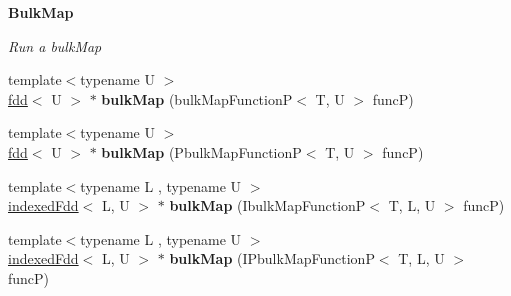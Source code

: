 \begin{Indent}{\bf Bulk\+Map}\par
{\em Run a bulk\+Map }\begin{DoxyCompactItemize}
\item 
\hypertarget{classfaster_1_1fdd_a0b4b82535fe1d2746973ce4e203d619f}{}\label{classfaster_1_1fdd_a0b4b82535fe1d2746973ce4e203d619f} 
{\footnotesize template$<$typename U $>$ }\\\hyperlink{classfaster_1_1fdd}{fdd}$<$ U $>$ $\ast$ {\bfseries bulk\+Map} (bulk\+Map\+FunctionP$<$ T, U $>$ funcP)
\item 
\hypertarget{classfaster_1_1fdd_a72e07b032ee97aeed0261a20769720a7}{}\label{classfaster_1_1fdd_a72e07b032ee97aeed0261a20769720a7} 
{\footnotesize template$<$typename U $>$ }\\\hyperlink{classfaster_1_1fdd}{fdd}$<$ U $>$ $\ast$ {\bfseries bulk\+Map} (Pbulk\+Map\+FunctionP$<$ T, U $>$ funcP)
\item 
\hypertarget{classfaster_1_1fdd_a97ad1e63823abe30de230da1456481d4}{}\label{classfaster_1_1fdd_a97ad1e63823abe30de230da1456481d4} 
{\footnotesize template$<$typename L , typename U $>$ }\\\hyperlink{classfaster_1_1indexedFdd}{indexed\+Fdd}$<$ L, U $>$ $\ast$ {\bfseries bulk\+Map} (Ibulk\+Map\+FunctionP$<$ T, L, U $>$ funcP)
\item 
\hypertarget{classfaster_1_1fdd_abfd585e52364a7be20125aa25c0ab141}{}\label{classfaster_1_1fdd_abfd585e52364a7be20125aa25c0ab141} 
{\footnotesize template$<$typename L , typename U $>$ }\\\hyperlink{classfaster_1_1indexedFdd}{indexed\+Fdd}$<$ L, U $>$ $\ast$ {\bfseries bulk\+Map} (I\+Pbulk\+Map\+FunctionP$<$ T, L, U $>$ funcP)
\end{DoxyCompactItemize}
\end{Indent}
